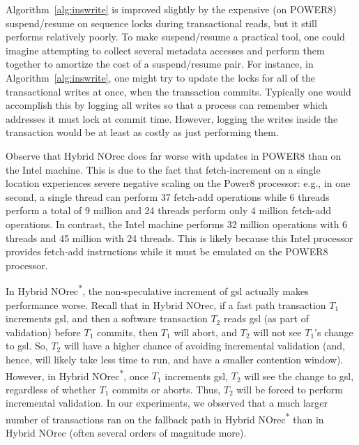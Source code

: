 Algorithm~\ref{alg:inswrite} is improved slightly by the expensive (on POWER8) suspend/resume on sequence locks during transactional reads, but it still performs relatively poorly. 
To make suspend/resume a practical tool, one could imagine attempting to 
collect several metadata accesses and perform them together to amortize the cost of a suspend/resume pair. For instance, 
in Algorithm~\ref{alg:inswrite}, one might try to update the locks for all of the transactional writes at once, when the transaction commits. 
Typically one would accomplish this by logging all writes so that a process can remember which addresses it must lock at commit time. 
However, logging the writes inside the transaction would be at least as costly as just performing them.

Observe that Hybrid NOrec does far worse with updates in POWER8 than on the Intel machine.
This is due to the fact that fetch-increment on a single location experiences severe negative scaling on the Power8 processor: e.g., in one second, a single
thread can perform 37 fetch-add operations while 6 threads perform a total of 9 million and 24 threads perform only 4 million fetch-add operations.
In contrast, the Intel machine performs 32 million operations with 6 threads and 45 million with 24 threads. This is likely because this Intel processor provides 
fetch-add instructions while it must be emulated on the POWER8 processor.

In Hybrid NOrec\textsuperscript{$\ast$}, the non-speculative increment of gsl actually makes performance worse. Recall that in Hybrid NOrec, 
if a fast path transaction $T_1$ increments gsl, and then a software transaction $T_2$ reads gsl (as part of validation) before $T_1$ commits, then $T_1$ will abort, 
and $T_2$ will not see $T_1$'s change to gsl. 
So, $T_2$ will have a higher chance of avoiding incremental validation (and, hence, will likely take less time to run, and have a smaller contention window). 
However, in Hybrid NOrec\textsuperscript{$\ast$}, once $T_1$ increments gsl, $T_2$ will see the change to gsl, regardless of whether $T_1$ commits or aborts. Thus, 
$T_2$ will be forced to perform incremental validation. In our experiments, we observed that a much larger number of transactions ran on 
the fallback path in Hybrid NOrec\textsuperscript{$\ast$} than in Hybrid NOrec (often several orders of magnitude more).
